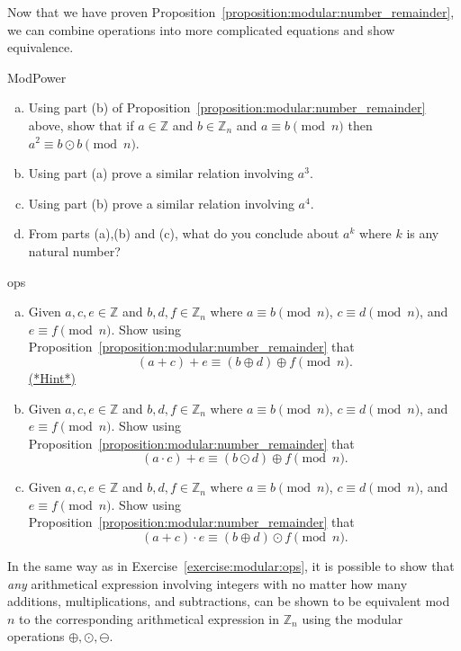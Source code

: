 Now that we have proven Proposition~\ref{proposition:modular:number_remainder}, we can combine operations into more complicated equations and show equivalence.

\begin{exercise}{ModPower}
\begin{enumerate}[(a)]
\item
Using part (b) of Proposition~\ref{proposition:modular:number_remainder} above, 
show that if $a \in {\mathbb Z}$ and $b \in {\mathbb Z_n}$ and $a \equiv b \pmod{n}$ then $a^2 \equiv b \odot b \pmod{n}$.
\item 
Using part (a) prove a similar relation involving $a^3$.
\item 
Using part (b) prove a similar relation involving $a^4$.
\item
From parts (a),(b) and (c), what do you conclude about $a^k$ where $k$ is any natural number?
\end{enumerate}
\end{exercise}


\begin{exercise}{ops}
\begin{enumerate}[(a)]
\item
Given $a,c,e \in {\mathbb Z}$ and $b,d ,f \in {\mathbb Z_n}$ where $a \equiv b \pmod{n}$,  $c \equiv d \pmod{n}$, and $e \equiv f \pmod{n}$. Show using Proposition~\ref{proposition:modular:number_remainder} that  
\[ (a + c) + e \equiv (b \oplus d) \oplus f \pmod{n}. \]
\hyperref[sec:modular_arithmetic:hints]{(*Hint*)}
\item
Given $a,c,e \in {\mathbb Z}$ and $b,d ,f \in {\mathbb Z_n}$ where $a \equiv b \pmod{n}$,  $c \equiv d \pmod{n}$, and $e \equiv f \pmod{n}$. Show using Proposition~\ref{proposition:modular:number_remainder} that  
\[ (a \cdot c) + e \equiv (b \odot d) \oplus f \pmod{n}. \]
\item
Given $a,c,e \in {\mathbb Z}$ and $b,d ,f \in {\mathbb Z_n}$ where $a \equiv b \pmod{n}$,  $c \equiv d \pmod{n}$, and $e \equiv f \pmod{n}$. Show using Proposition~\ref{proposition:modular:number_remainder} that  
\[ (a + c) \cdot e \equiv (b \oplus d) \odot f \pmod{n}. \]
\end{enumerate}
\end{exercise}

In the same way as in Exercise~\ref{exercise:modular:ops}, it is possible to show that \emph{any} arithmetical expression involving integers with no matter how many additions, multiplications, and subtractions, can be shown to be equivalent mod $n$ to the corresponding arithmetical expression in ${\mathbb Z}_n$ using the modular operations $\oplus, \odot, \ominus$.

